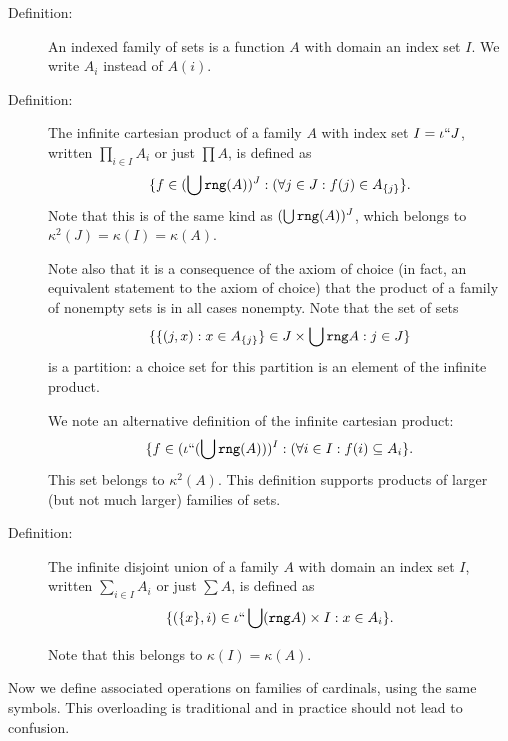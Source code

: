 \documentclass[12pt]{article}
\begin{document}
\begin{description}

\item[Definition:]  An indexed family of sets is a function $A$ with domain an index set $I$.  We write $A_i$ instead of $A(i)$. 

\item[Definition:]  The infinite cartesian product of a family $A$ with index set $I=\iota``J$, written $\prod_{i \in I}A_i$ or just $\prod A$, is defined as $$\{f \in (\bigcup {\tt rng}(A))^J:(\forall j \in J:f(j) \in A_{\{j\}}\}.$$
Note that this is of the same kind as $(\bigcup {\tt rng}(A))^J$, which belongs to $\kappa^2(J) = \kappa(I) = \kappa(A)$.  

Note also that it is a consequence of the axiom of choice (in fact, an equivalent statement to the axiom of choice) that the product of a family of nonempty sets is in all cases nonempty.  Note that the set of sets $$\{\{(j,x):x \in A_{\{j\}}\}\in J \times \bigcup {\tt rng} A:j \in J\}$$ is a partition:  a choice set for this partition is an element of the infinite product.

We note an alternative definition of the infinite cartesian product:  $$\{f \in (\iota``(\bigcup {\tt rng}(A)))^I:(\forall i \in I:f(i) \subseteq A_i\}.$$  This set belongs to $\kappa^2(A)$.  This definition supports products of larger (but not much larger) families of sets.

\item[Definition:]  The infinite disjoint union of a family $A$ with domain an index set $I$, written $\sum_{i \in I}A_i$ or just $\sum A$, is defined as $$\{(\{x\},i) \in \iota``\bigcup({\tt rng} A) \times I:x \in A_i\}.$$

Note that this belongs to $\kappa(I)=\kappa(A)$.

\end{description}

Now we define associated operations on families of cardinals, using the same symbols.  This overloading is traditional and in practice should not lead to confusion.
\end{document}
